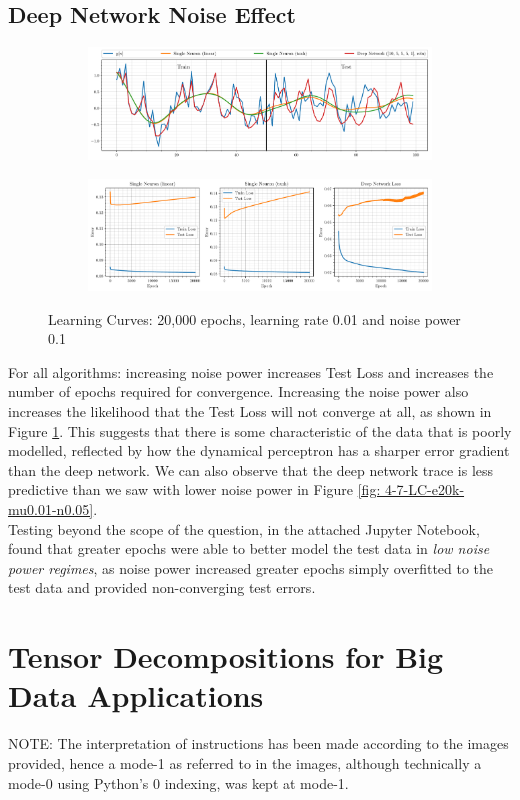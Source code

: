 \documentclass[12pt]{article}
\numberwithin{equation}{section}
\begin{document}
	\subsection{Deep Network Noise Effect} \label{sec: 4-7-DL-noise}
		\vspace*{-0.8\baselineskip}
		\begin{figure}[H]
			\centering
			\begin{subfigure}{\textwidth}
				\centering
				\includegraphics[width=\textwidth]{../Python/figures/Q4_LMS2DL_4_7+8_06.pdf} 
				\captionsetup{justification=centering}
			\end{subfigure}
			\begin{subfigure}{\textwidth}
				\centering
				\includegraphics[width=\textwidth]{../Python/figures/Q4_LMS2DL_4_7+8_21.pdf} 
				\captionsetup{justification=centering}
			\end{subfigure}
			
			\captionsetup{justification=centering}
			\caption{Learning Curves: 20,000 epochs, learning rate 0.01 and noise power 0.1}
			\label{fig: 4-7-LC-e20k-mu0.01-n0.1}
		\end{figure}
		For all algorithms: increasing noise power increases Test Loss and increases the number of epochs required for convergence. Increasing the noise power also increases the likelihood that the Test Loss will not converge at all, as shown in Figure \ref{fig: 4-7-LC-e20k-mu0.01-n0.1}. This suggests that there is some characteristic of the data that is poorly modelled, reflected by how the dynamical perceptron has a sharper error gradient than the deep network. We can also observe that the deep network trace is less predictive than we saw with lower noise power in Figure \ref{fig: 4-7-LC-e20k-mu0.01-n0.05}. \\
		Testing beyond the scope of the question, in the attached Jupyter Notebook, found that greater epochs were able to better model the test data in \textit{low noise power regimes}, as noise power increased greater epochs simply overfitted to the test data and provided non-converging test errors.
		
	
\section{Tensor Decompositions for Big Data Applications} \label{sec: 5-TD-BD}
	NOTE: The interpretation of instructions has been made according to the images provided, hence a mode-1 as referred to in the images, although technically a mode-0 using Python's 0 indexing, was kept at mode-1.
	
\end{document}
